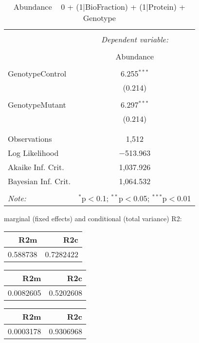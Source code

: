 \documentclass[11pt]{report}
\begin{document}
\begin{table}[!htbp] \centering 
  \caption{Abundance ~ 0 + (1|BioFraction) + (1|Protein) + Genotype} 
  \label{} 
\begin{tabular}{@{\extracolsep{5pt}}lc} 
\\[-1.8ex]\hline 
\hline \\[-1.8ex] 
 & \multicolumn{1}{c}{\textit{Dependent variable:}} \\ 
\cline{2-2} 
\\[-1.8ex] & Abundance \\ 
\hline \\[-1.8ex] 
 GenotypeControl & 6.255$^{***}$ \\ 
  & (0.214) \\ 
  & \\ 
 GenotypeMutant & 6.297$^{***}$ \\ 
  & (0.214) \\ 
  & \\ 
\hline \\[-1.8ex] 
Observations & 1,512 \\ 
Log Likelihood & $-$513.963 \\ 
Akaike Inf. Crit. & 1,037.926 \\ 
Bayesian Inf. Crit. & 1,064.532 \\ 
\hline 
\hline \\[-1.8ex] 
\textit{Note:}  & \multicolumn{1}{r}{$^{*}$p$<$0.1; $^{**}$p$<$0.05; $^{***}$p$<$0.01} \\ 
\end{tabular} 
\end{table} 
marginal (fixed effects) and conditional (total variance) R2:

\begin{tabular}{r|r}
\hline
R2m & R2c\\
\hline
0.588738 & 0.7282422\\
\hline
\end{tabular}

\begin{tabular}{r|r}
\hline
R2m & R2c\\
\hline
0.0082605 & 0.5202608\\
\hline
\end{tabular}

\begin{tabular}{r|r}
\hline
R2m & R2c\\
\hline
0.0003178 & 0.9306968\\
\hline
\end{tabular}
\end{document}
